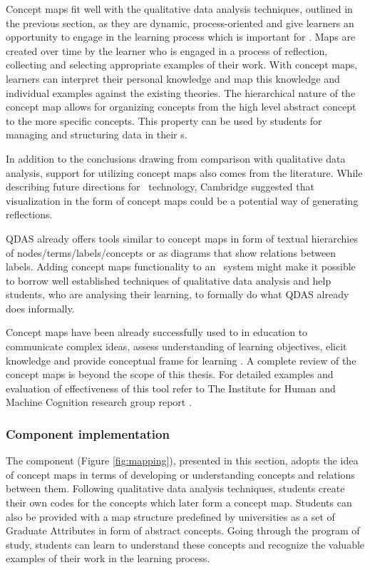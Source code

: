 Concept maps fit well with the qualitative data analysis techniques, outlined in
the previous section, as they are dynamic, process-oriented and give learners an
opportunity to engage in the learning process \citep{Mcaleese1998} which is
important for \LLLs \citep{Schuetze2006,Divjak2004}. Maps are created over time
by the learner who is engaged in a process of reflection, collecting and
selecting appropriate examples of their work. With concept maps, learners can
interpret their personal knowledge and map this knowledge and individual
examples against the existing theories. The hierarchical nature of the concept
map allows for organizing concepts from the high level abstract concept to the
more specific concepts. This property can be used by students for managing and
structuring data in their \ep s. 

In addition to the conclusions drawing from comparison with qualitative data
analysis, support for utilizing concept maps also comes from the literature.
While describing future directions for \ep~technology, Cambridge
\citeyearpar{Cambridge2010} suggested that visualization in the form of concept
maps could be a potential way of generating reflections.

QDAS already offers tools similar to concept maps in form of textual hierarchies
of nodes/terms/labels/concepts or as diagrams that show relations between
labels. Adding concept maps functionality to an \ep~system might make it
possible to borrow well established techniques of qualitative data analysis and
help students, who are analysing their learning, to formally do what QDAS
already does informally. 

Concept maps have been already successfully used to in education to communicate
complex ideas, assess understanding of learning objectives, elicit knowledge and
provide conceptual frame for learning \citep{Novak2010}. A complete review of
the concept maps is beyond the scope of this thesis. For detailed examples and
evaluation of effectiveness of this tool refer to The Institute for Human and
Machine Cognition research group report \citep{Canas2003}.

\subsubsection{Component implementation}

The component (Figure \ref{fig:mapping}), presented in this section, adopts the
idea of concept maps in terms of developing or understanding concepts and
relations between them. Following qualitative data analysis techniques, students
create their own codes for the concepts which later form a concept map. Students
can also be provided with a map structure predefined by universities as a set of
Graduate Attributes in form of abstract concepts. Going through the program of
study, students can learn to understand these concepts and recognize the
valuable examples of their work in the learning process.

